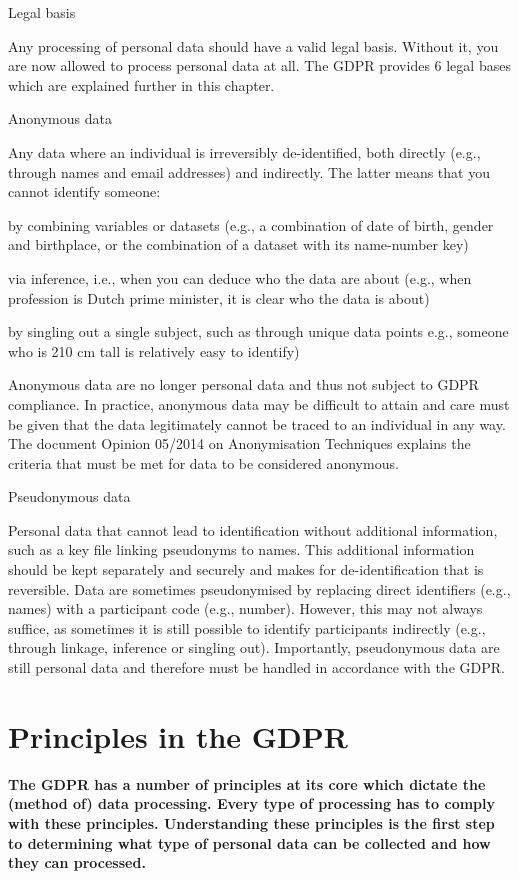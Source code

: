 \documentclass[
]{book}
\begin{document}
Legal basis

Any processing of personal data should have a valid legal basis. Without it,
you are now allowed to process personal data at all. The GDPR provides 6 legal
bases which are explained further in this chapter.

Anonymous data

Any data where an individual is irreversibly de-identified, both directly
(e.g., through names and email addresses) and indirectly. The latter means
that you cannot identify someone:

by combining variables or datasets (e.g., a combination of date of birth,
gender and birthplace, or the combination of a dataset with its name-number key)

via inference, i.e., when you can deduce who the data are about (e.g.,
when profession is Dutch prime minister, it is clear who the data is about)

by singling out a single subject, such as through unique data points
e.g., someone who is 210 cm tall is relatively easy to identify)

Anonymous data are no longer personal data and thus not subject to GDPR
compliance. In practice, anonymous data may be difficult to attain and care
must be given that the data legitimately cannot be traced to an individual in
any way. The document
Opinion 05/2014 on Anonymisation Techniques
explains the criteria that must be met for data to be considered anonymous.

Pseudonymous data

Personal data that cannot lead to identification without additional
information, such as a key file linking pseudonyms to names. This additional
information should be kept separately and securely and makes for
de-identification that is reversible. Data are sometimes pseudonymised by
replacing direct identifiers (e.g., names) with a participant code (e.g.,
number). However, this may not always suffice, as sometimes it is still
possible to identify participants indirectly (e.g., through linkage, inference
or singling out). Importantly, pseudonymous data are still personal data and
therefore must be handled in accordance with the GDPR.

\hypertarget{gdpr-principles}{%
\section{Principles in the GDPR}\label{gdpr-principles}}

\textbf{The GDPR has a number of principles at its core which dictate the (method of)
data processing. Every type of processing has to comply with these principles.
Understanding these principles is the first step to determining what type of
personal data can be collected and how they can processed.}
\end{document}
